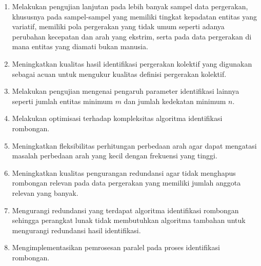 \begin{enumerate}
    \item Melakukan pengujian lanjutan pada lebih banyak sampel data pergerakan, khususnya pada sampel-sampel yang memiliki tingkat kepadatan entitas yang variatif, memiliki pola pergerakan yang tidak umum seperti adanya perubahan kecepatan dan arah yang ekstrim, serta pada data pergerakan di mana entitas yang diamati bukan manusia.
    \item Meningkatkan kualitas hasil identifikasi pergerakan kolektif yang digunakan sebagai acuan untuk mengukur kualitas definisi pergerakan kolektif.
    \item Melakukan pengujian mengenai pengaruh parameter identifikasi lainnya seperti jumlah entitas minimum $m$ dan jumlah kedekatan minimum $n$.
    \item Melakukan optimisasi terhadap kompleksitas algoritma identifikasi rombongan.
    \item Meningkatkan fleksibilitas perhitungan perbedaan arah agar dapat mengatasi masalah perbedaan arah yang kecil dengan frekuensi yang tinggi.
    \item Meningkatkan kualitas pengurangan redundansi agar tidak menghapus rombongan relevan pada data pergerakan yang memiliki jumlah anggota relevan yang banyak.
    \item Mengurangi redundansi yang terdapat algoritma identifikasi rombongan sehingga perangkat lunak tidak membutuhkan algoritma tambahan untuk mengurangi redundansi hasil identifikasi.
    \item Mengimplementasikan pemrosesan paralel pada proses identifikasi rombongan.
\end{enumerate}